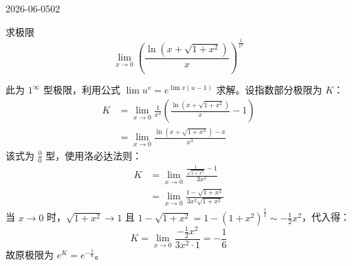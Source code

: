 \begin{mistake}{2026-06-05}{02}

\begin{problemcontent}
求极限
\[ \lim_{x \to 0} \left( \frac{\ln(x + \sqrt{1+x^2})}{x} \right)^{\frac{1}{x^2}} \]
\end{problemcontent}

\begin{solutioncontent}
此为 \(1^\infty\) 型极限，利用公式 \(\lim u^v = e^{\lim v(u-1)}\) 求解。设指数部分极限为 \(K\)：
\[
\begin{aligned}
K &= \lim_{x \to 0} \frac{1}{x^2} \left( \frac{\ln(x + \sqrt{1+x^2})}{x} - 1 \right) \\
&= \lim_{x \to 0} \frac{\ln(x + \sqrt{1+x^2}) - x}{x^3}
\end{aligned}
\]
该式为 \(\frac{0}{0}\) 型，使用洛必达法则：
\[
\begin{aligned}
K &= \lim_{x \to 0} \frac{ \frac{1}{\sqrt{1+x^2}} - 1 }{ 3x^2 } \\
&= \lim_{x \to 0} \frac{1 - \sqrt{1+x^2}}{3x^2 \sqrt{1+x^2}}
\end{aligned}
\]
当 \(x \to 0\) 时，\(\sqrt{1+x^2} \to 1\) 且 \(1 - \sqrt{1+x^2} = 1 - (1+x^2)^{\frac{1}{2}} \sim -\frac{1}{2}x^2\)，代入得：
\[
K = \lim_{x \to 0} \frac{-\frac{1}{2}x^2}{3x^2 \cdot 1} = -\frac{1}{6}
\]
故原极限为 \(e^K = e^{-\frac{1}{6}}\)。
\end{solutioncontent}


\end{mistake}

